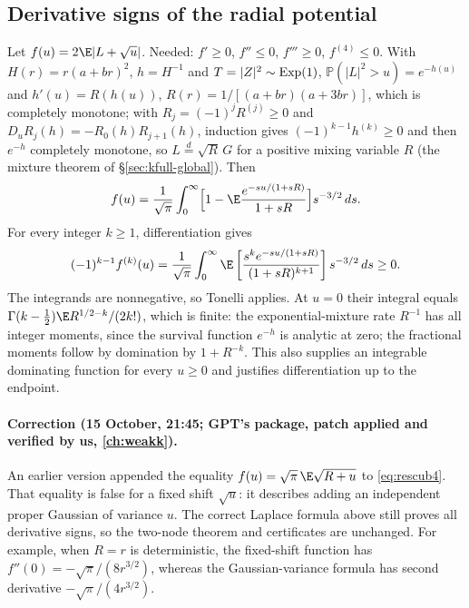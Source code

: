 \subsection{Derivative signs of the radial potential}
Let $f(u)=2\E|L+\sqrt u|$. Needed: $f'\ge0$, $f''\le0$, $f'''\ge0$, $f^{(4)}\le0$. With $H(r)=r(a+br)^2$, $h=H^{-1}$ and $T=|Z|^2\sim{\rm Exp}(1)$, $\mathbb P(|L|^2>u)=e^{-h(u)}$ and $h'(u)=R(h(u))$,
$R(r)=1/[(a+br)(a+3br)]$, which is completely monotone; with $R_j=(-1)^jR^{(j)}\ge0$ and $D_uR_j(h)=-R_0(h)R_{j+1}(h)$, induction gives $(-1)^{k-1}h^{(k)}\ge0$ and then $e^{-h}$ completely monotone,
so $L\overset d=\sqrt R\,G$ for a positive mixing variable $R$ (the mixture theorem of \S\ref{sec:kfull-global}). Then
\begin{equation}\label{eq:rescub4}
f(u)=\frac1{\sqrt\pi}\int_0^\infty\Bigl[1-\E\frac{e^{-su/(1+sR)}}{1+sR}\Bigr]s^{-3/2}\,ds.
\end{equation}
For every integer $k\ge1$, differentiation gives
\[
(-1)^{k-1}f^{(k)}(u)=\frac1{\sqrt\pi}\int_0^\infty
\E\left[\frac{s^k e^{-su/(1+sR)}}{(1+sR)^{k+1}}\right]s^{-3/2}\,ds\ge0.
\]
The integrands are nonnegative, so Tonelli applies. At $u=0$ their integral equals
$\Gamma(k-\tfrac12)\E R^{1/2-k}/(2k!)$, which is finite: the exponential-mixture rate $R^{-1}$ has all integer moments, since the survival function $e^{-h}$ is analytic at zero; the fractional moments follow by domination by $1+R^{-k}$. This also supplies an integrable dominating function for every $u\ge0$ and justifies differentiation up to the endpoint.
\paragraph{Correction (15 October, 21:45; GPT's  package, patch applied and verified by us, \autoref{ch:weakk}).} An earlier version appended the equality $f(u)=\sqrt\pi\,\E\sqrt{R+u}$ to \eqref{eq:rescub4}. That equality is false for a fixed shift $\sqrt u$: it describes adding an independent proper Gaussian of variance $u$. The correct Laplace formula above still proves all derivative signs, so the two-node theorem and certificates are unchanged. For example, when $R=r$ is deterministic, the fixed-shift function has $f''(0)=-\sqrt\pi/(8r^{3/2})$, whereas the Gaussian-variance formula has second derivative $-\sqrt\pi/(4r^{3/2})$.

